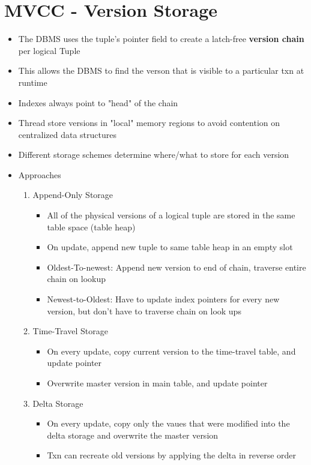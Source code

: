 \documentclass[11pt]{article}
\begin{document}
\section{MVCC - Version Storage}
\begin{itemize}
    \item The DBMS uses the tuple's pointer field to create a latch-free \textbf{version chain} per logical Tuple
    \item This allows the DBMS to find the verson that is visible to a particular txn at runtime
    \item Indexes always point to "head" of the chain
    \item Thread store versions in "local" memory regions to avoid contention on centralized data structures
    \item Different storage schemes determine where/what to store for each version
    \item Approaches
    \begin{enumerate}
        \item Append-Only Storage
        \begin{itemize}
            \item All of the physical versions of a logical tuple are stored in the same table space (table heap)
            \item On update, append new tuple to same table heap in an empty slot
            \item Oldest-To-newest: Append new version to end of chain, traverse entire chain on lookup
            \item Newest-to-Oldest: Have to update index pointers for every new version, but don't have to traverse chain on look ups
        \end{itemize}
        \item Time-Travel Storage
        \begin{itemize}
            \item On every update, copy current version to the time-travel table, and update pointer
            \item Overwrite master version in main table, and update pointer
        \end{itemize}
        \item Delta Storage
        \begin{itemize}
            \item On every update, copy only the vaues that were modified into the delta storage and overwrite the master version
            \item Txn can recreate old versions by applying the delta in reverse order

\end{itemize}
\end{enumerate}
\end{itemize}
\end{document}
